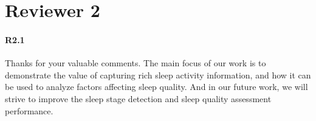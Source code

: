 \section*{Reviewer 2}
\paragraph{R2.1} Thanks for your valuable comments. The main focus of our work is to demonstrate the value of capturing rich sleep activity information, and how it can be used to analyze factors affecting sleep quality. And in our future work, we will strive to improve the sleep stage detection and sleep quality assessment performance. 